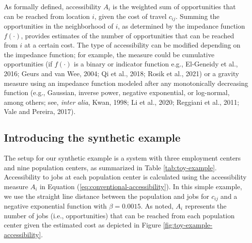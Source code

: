 \documentclass[]{elsarticle} %
\begin{document}
As formally defined, accessibility \(A_i\) is the weighted sum of
opportunities that can be reached from location \(i\), given the cost of
travel \(c_{ij}\). Summing the opportunities in the neighborhood of
\(i\), as determined by the impedance function \(f(\cdot)\), provides
estimates of the number of opportunities that can be reached from \(i\)
at a certain cost. The type of accessibility can be modified depending
on the impedance function; for example, the measure could be cumulative
opportunities (if \(f(\cdot)\) is a binary or indicator function e.g.,
El-Geneidy et al., 2016; Geurs and van Wee, 2004; Qi et al., 2018; Rosik
et al., 2021) or a gravity measure using an impedance function modeled
after any monotonically decreasing function (e.g., Gaussian, inverse
power, negative exponential, or log-normal, among others; see,
\emph{inter alia}, Kwan, 1998; Li et al., 2020; Reggiani et al., 2011;
Vale and Pereira, 2017).

\hypertarget{accessibility-numerical-example}{%
\subsection{Introducing the synthetic
example}\label{accessibility-numerical-example}}

The setup for our synthetic example is a system with three employment
centers and nine population centers, as summarized in Table
\ref{tab:toy-example}. Accessibility to jobs at each population center
is calculated using the accessibility measure \(A_i\) in Equation
(\ref{eq:conventional-accessibility}). In this simple example, we use
the straight line distance between the population and jobs for
\(c_{ij}\) and a negative exponential function with \(\beta = 0.0015\).
As noted, \(A_i\) represents the number of jobs (i.e., opportunities)
that can be reached from each population center given the estimated cost
as depicted in Figure \ref{fig:toy-example-accessibility}.
\end{document}
